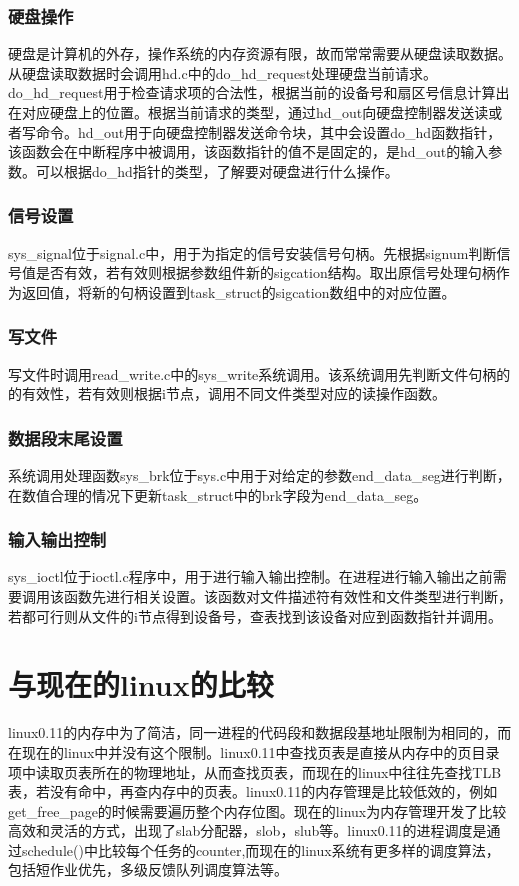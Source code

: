 \documentclass[]{report}
\begin{document}
\subsubsection{硬盘操作}
硬盘是计算机的外存，操作系统的内存资源有限，故而常常需要从硬盘读取数据。从硬盘读取数据时会调用hd.c中的do\_hd\_request处理硬盘当前请求。do\_hd\_request用于检查请求项的合法性，根据当前的设备号和扇区号信息计算出在对应硬盘上的位置。根据当前请求的类型，通过hd\_out向硬盘控制器发送读或者写命令。hd\_out用于向硬盘控制器发送命令块，其中会设置do\_hd函数指针，该函数会在中断程序中被调用，该函数指针的值不是固定的，是hd\_out的输入参数。可以根据do\_hd指针的类型，了解要对硬盘进行什么操作。
\subsubsection{信号设置}
sys\_signal位于signal.c中，用于为指定的信号安装信号句柄。先根据signum判断信号值是否有效，若有效则根据参数组件新的sigcation结构。取出原信号处理句柄作为返回值，将新的句柄设置到task\_struct的sigcation数组中的对应位置。
\subsubsection{写文件}
写文件时调用read\_write.c中的sys\_write系统调用。该系统调用先判断文件句柄的的有效性，若有效则根据i节点，调用不同文件类型对应的读操作函数。
\subsubsection{数据段末尾设置}
系统调用处理函数sys\_brk位于sys.c中用于对给定的参数end\_data\_seg进行判断，在数值合理的情况下更新task\_struct中的brk字段为end\_data\_seg。
\subsubsection{输入输出控制}
sys\_ioctl位于ioctl.c程序中，用于进行输入输出控制。在进程进行输入输出之前需要调用该函数先进行相关设置。该函数对文件描述符有效性和文件类型进行判断，若都可行则从文件的i节点得到设备号，查表找到该设备对应到函数指针并调用。

\section{与现在的linux的比较}
linux0.11的内存中为了简洁，同一进程的代码段和数据段基地址限制为相同的，而在现在的linux中并没有这个限制。linux0.11中查找页表是直接从内存中的页目录项中读取页表所在的物理地址，从而查找页表，而现在的linux中往往先查找TLB表，若没有命中，再查内存中的页表。linux0.11的内存管理是比较低效的，例如get\_free\_page的时候需要遍历整个内存位图。现在的linux为内存管理开发了比较高效和灵活的方式，出现了slab分配器，slob，slub等。linux0.11的进程调度是通过schedule()中比较每个任务的counter,而现在的linux系统有更多样的调度算法，包括短作业优先，多级反馈队列调度算法等。
\end{document}
